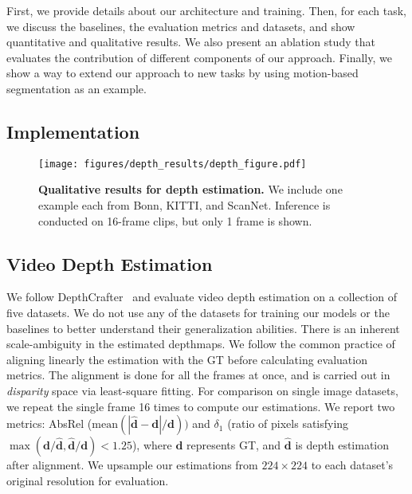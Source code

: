 
First, we provide details about our architecture and training. 
Then, for each task, we discuss the baselines, the evaluation metrics and datasets, and show quantitative and qualitative results.
We also present an ablation study that evaluates the contribution of different components of our approach.
Finally, we show a way to extend our approach to new tasks by using motion-based segmentation as an example.

\subsection{Implementation}\label{sec:impl}






\begin{figure}
    \centering
    \texttt{[image: figures/depth\_results/depth\_figure.pdf]}
    \caption{
        \textbf{Qualitative results for depth estimation.}
        We include one example each from Bonn, KITTI, and ScanNet. 
        Inference is conducted on 16-frame clips, but only 1 frame is shown. 
        }\label{fig:depth}
\end{figure}

\subsection{Video Depth Estimation}


We follow DepthCrafter~\cite{hu2024depthcrafter} and evaluate video depth estimation on a collection of five datasets.
We do not use any of the datasets for training our models or the baselines to better understand their generalization abilities.
There is an inherent scale-ambiguity in the estimated depthmaps. 
We follow the common practice of aligning linearly the estimation with the GT before calculating evaluation metrics.
The alignment is done for all the frames at once, and is carried out in \emph{disparity} space via least-square fitting.
For comparison on single image datasets, we repeat the single frame 16 times to compute our estimations.
We report two metrics: AbsRel ($\text{mean}(|\hat{\mathbf{d}}-\mathbf{d}| / \mathbf{d}))$ and $\delta_1$ (ratio of pixels satisfying $\max(\mathbf{d}/\hat{\mathbf{d}}, \hat{\mathbf{d}}/\mathbf{d})<1.25$), where $\mathbf{d}$ represents GT, and $\hat{\mathbf{d}}$ is depth estimation after alignment. 
We upsample our estimations from $224\times224$ to each dataset's original resolution for evaluation.

